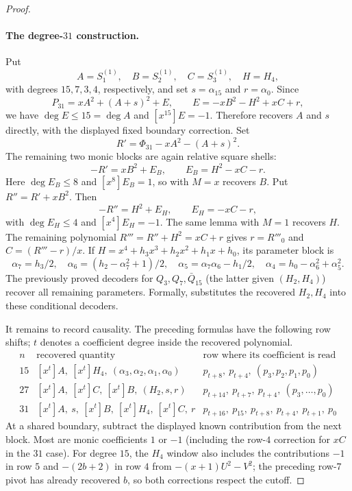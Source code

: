\begin{proof}
    \paragraph{The degree-$31$ construction.}
    Put
    \[
      A=S^{(1)}_1,\quad B=S^{(1)}_2,\quad C=S^{(1)}_3,
      \quad H=H_4,
    \]
    with degrees $15,7,3,4$, respectively, and set
    $s=\alpha _{15}$ and $r=\alpha _0$.  Since
    \[
      P_{31}=xA^2+(A+s)^2+E,
      \qquad E=-xB^2-H^2+xC+r,
    \]
    we have $\deg E\le15=\deg A$ and $[x^{15}]E=-1$.  Therefore
     recovers $A$ and $s$ directly, with
    the displayed fixed boundary correction.  Set
    \[
      R'=\Phi_{31}-xA^2-(A+s)^2.
    \]
    The remaining two monic blocks are again relative square shells:
    \[
      -R'=xB^2+E_B,\qquad E_B=H^2-xC-r.
    \]
    Here $\deg E_B\le8$ and $[x^8]E_B=1$, so
     with $M=x$ recovers $B$.  Put
    $R''=R'+xB^2$.  Then
    \[
      -R''=H^2+E_H,\qquad E_H=-xC-r,
    \]
    with $\deg E_H\le4$ and $[x^4]E_H=-1$.  The same lemma with $M=1$
    recovers $H$.  The remaining polynomial
    $R'''=R''+H^2=xC+r$ gives
    $r=R'''_0$ and $C=(R'''-r)/x$.  If
    $H=x^4+h_3x^3+h_2x^2+h_1x+h_0$, its parameter block is
    \[
      \alpha _7=h_3/2,\quad
      \alpha _6=(h_2-\alpha _7^2+1)/2,\quad
      \alpha _5=\alpha _7\alpha _6-h_1/2,\quad
      \alpha _4=h_0-\alpha _6^2+\alpha _5^2.
    \]
    The previously proved decoders for $Q_3,Q_7,\bar Q_{15}$ (the latter
    given $(H_2,H_4)$) recover all remaining parameters.  Formally,
     substitutes the recovered
    $H_2,H_4$ into these conditional decoders.

    It remains to record causality.  The preceding formulas have the following
    row shifts; $t$ denotes a coefficient degree inside the recovered
    polynomial.
    \[
    \begin{array}{c|c|c}
      n&\text{recovered quantity}&\text{row where its coefficient is read}\\ \hline
      15&[x^t]A,\ [x^t]H_4,\
          (\alpha_3,\alpha_2,\alpha_1,\alpha_0)
        &p_{t+8},\ p_{t+4},\ (p_3,p_2,p_1,p_0)\\
      27&[x^t]A,\ [x^t]C,\ [x^t]B,\ (H_2,s,r)
        &p_{t+14},\ p_{t+7},\ p_{t+4},\ (p_3,\ldots,p_0)\\
      31&[x^t]A,\ s,\ [x^t]B,\ [x^t]H_4,\ [x^t]C,\ r
        &p_{t+16},\ p_{15},\ p_{t+8},\ p_{t+4},\ p_{t+1},\ p_0
    \end{array}
    \]
    At a shared boundary, subtract the displayed known contribution from
    the next block.  Most are monic coefficients $1$ or $-1$ (including
    the row-$4$ correction for $xC$ in the $31$ case).  For degree $15$,
    the $H_4$ window also includes the contributions $-1$ in row $5$ and
    $-(2b+2)$ in row $4$ from $-(x+1)U^2-V^2$; the preceding row-$7$
    pivot has already recovered $b$, so both corrections respect the cutoff.


\end{proof}
